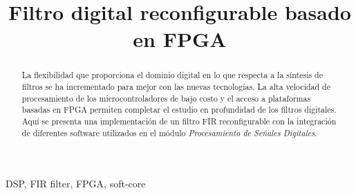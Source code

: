 \documentclass[conference]{IEEEtran}
\begin{document}
%
\title{Filtro digital reconfigurable basado en FPGA}

\author{
}



\maketitle


\begin{abstract}
  La flexibilidad que proporciona el dominio digital en lo que
  respecta a la síntesis de filtros se ha incrementado para mejor con las
  nuevas tecnologías. La alta velocidad de procesamiento de los 
  microcontroladores de bajo costo y el acceso a plataformas basadas
  en FPGA permiten completar el estudio en profundidad de los filtros
  digitales. Aquí se presenta una implementación de un filtro FIR
  reconfigurable con la integración de diferentes software utilizados
  en el módulo \emph{Procesamiento de Señales Digitales}.
\end{abstract}

\begin{IEEEkeywords}
DSP, FIR filter, FPGA, soft-core 
\end{IEEEkeywords}



%
\IEEEpeerreviewmaketitle
\end{document}

